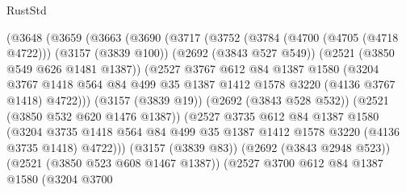 \begin{lexlean}{RustStd}
\begin{coremodule}
                  (@3648
                    (@3659
                      (@3663
                        (@3690
                          (@3717
                            (@3752
                              (@3784
                                (@4700 (@4705 (@4718 @4722)))
                                (@3157 (@3839 @100))
                                (@2692 (@3843 @527 @549))
                                (@2521 (@3850 @549 @626 @1481 @1387))
                                (@2527
                                  @3767
                                  @612
                                  @84
                                  @1387
                                  @1580
                                  (@3204
                                    @3767
                                    @1418
                                    @564
                                    @84
                                    @499
                                    @35
                                    @1387
                                    @1412
                                    @1578
                                    @3220
                                    (@4136 @3767 @1418)
                                    @4722)))
                              (@3157 (@3839 @19))
                              (@2692 (@3843 @528 @532))
                              (@2521 (@3850 @532 @620 @1476 @1387))
                              (@2527
                                @3735
                                @612
                                @84
                                @1387
                                @1580
                                (@3204
                                  @3735
                                  @1418
                                  @564
                                  @84
                                  @499
                                  @35
                                  @1387
                                  @1412
                                  @1578
                                  @3220
                                  (@4136 @3735 @1418)
                                  @4722)))
                            (@3157 (@3839 @83))
                            (@2692 (@3843 @2948 @523))
                            (@2521 (@3850 @523 @608 @1467 @1387))
                            (@2527
                              @3700
                              @612
                              @84
                              @1387
                              @1580
                              (@3204
                                @3700

\end{coremodule}
\end{lexlean}
